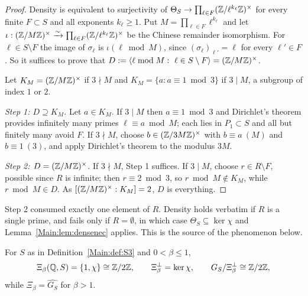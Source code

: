 \begin{proof}
Density is equivalent to surjectivity of
$\Theta_S\to\prod_{\ell\in F}(\mathbb{Z}/\ell^{k_\ell}\mathbb{Z})^\times$ for every finite
$F\subset S$ and all exponents $k_\ell\ge1$. Put $M=\prod_{\ell\in F}\ell^{k_\ell}$
and let $\iota:(\mathbb{Z}/M\mathbb{Z})^\times\xrightarrow{\sim}\prod_{\ell\in F}(\mathbb{Z}/\ell^{k_\ell}\mathbb{Z})^\times$
be the Chinese remainder isomorphism. For $\ell\in S\setminus F$ the image of
$\sigma_\ell$ is $\iota(\ell\bmod M)$, since $(\sigma_\ell)_{\ell'}=\ell$
for every $\ell'\in F$. So it suffices to prove that
$D:=\langle\ell\bmod M:\ \ell\in S\setminus F\rangle=(\mathbb{Z}/M\mathbb{Z})^\times$.

Let $K_M=(\mathbb{Z}/M\mathbb{Z})^\times$ if $3\nmid M$ and
$K_M=\{a:a\equiv1\bmod3\}$ if $3\mid M$, a subgroup of index $1$ or $2$.

\emph{Step 1: $D\supseteq K_M$.} Let $a\in K_M$. If $3\mid M$ then
$a\equiv1\bmod3$ and Dirichlet's theorem provides infinitely many primes
$\ell\equiv a\bmod M$; each lies in $P_1\subset S$ and all but finitely many
avoid $F$. If $3\nmid M$, choose $b\in(\mathbb{Z}/3M\mathbb{Z})^\times$ with $b\equiv a\ (M)$
and $b\equiv1\ (3)$, and apply Dirichlet's theorem to the modulus $3M$.

\emph{Step 2: $D=(\mathbb{Z}/M\mathbb{Z})^\times$.} If $3\nmid M$, Step 1 suffices. If
$3\mid M$, choose $r\in R\setminus F$, possible since $R$ is infinite; then
$r\equiv2\bmod3$, so $r\bmod M\notin K_M$, while $r\bmod M\in D$. As
$[(\mathbb{Z}/M\mathbb{Z})^\times:K_M]=2$, $D$ is everything.
\end{proof}

\begin{remark}\label{Main:rem:onewitness}
Step 2 consumed exactly one element of $R$. Density holds verbatim if $R$ is a
single prime, and fails only if $R=\emptyset$, in which case
$\Theta_S\subseteq\ker\chi$ and Lemma~\ref{Main:lem:densenec} applies. This is the
source of the phenomenon below.
\end{remark}

\begin{proposition}\label{Main:prop:Xiexact}
For $S$ as in Definition~\ref{Main:def:S3} and $0<\beta\le1$,
\[
\Xi_\beta(\mathbb{Q},S)=\{1,\chi\}\cong\mathbb{Z}/2\mathbb{Z},\qquad\Xi_\beta^\perp=\ker\chi,\qquad
G_S/\Xi_\beta^\perp\cong\mathbb{Z}/2\mathbb{Z} ,
\]
while $\Xi_\beta=\widehat{G_S}$ for $\beta>1$.
\end{proposition}

